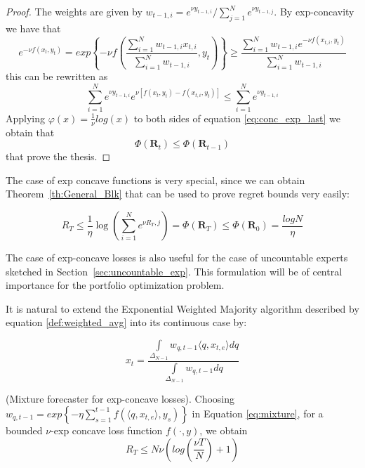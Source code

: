 \begin{proof}
    The weights are given by $w_{t-1,i}=e^{\nu y_{t-1,i}}/\sum\limits_{j=1}^N e^{\nu y_{t-1,j}}$.
    By exp-concavity we have that
    \begin{equation}
        e^{-\nu f(x_t,y_t)}=exp\left\{-\nu f \left(\frac{\sum\limits_{i=1}^N w_{t-1,i}x_{t,i}}{\sum\limits_{i=1}^N w_{t-1,i}},y_t\right)\right\}\ge \frac{\sum\limits_{i=1}^N w_{t-1,i}e^{-\nu f(x_{t,i},y_t)}}{\sum\limits_{i=1}^N w_{t-1,i}}
    \end{equation}
    this can be rewritten as 
    \begin{equation}\label{eq:conc_exp_last}
        \sum\limits_{i=1}^N e^{\nu y_{t-1,i}}e^{\nu [f(x_t,y_t)-f(x_{t,i},y_t)]}\le \sum\limits_{i=1}^N e^{\nu y_{t-1,i}}
    \end{equation}
    Applying $\varphi(x)=\frac{1}{\nu}log(x)$ to both sides of equation \eqref{eq:conc_exp_last} we obtain that $$\Phi(\mathbf R_{t})\le \Phi(\mathbf R_{t-1})$$ that prove the thesis.
\end{proof}

The case of exp concave functions is very special, since we can obtain Theorem~\ref{th:General_Blk} that can be used to prove regret bounds very easily:

\begin{equation}\label{eq:regret_exp_finite}
    R_T\le \frac{1}{\eta}\log\left(\sum\limits_{i=1}^N e^{\nu R_T,j}\right)=\Phi(\mathbf R_T)\le\Phi(\mathbf R_0) = \frac{log N}{\eta}
\end{equation}

The case of exp-concave losses is also useful for the case of uncountable experts sketched in Section~\ref{sec:uncountable_exp}. This formulation will be of central importance for the portfolio optimization problem.

It is natural to extend the Exponential Weighted Majority algorithm described by equation \eqref{def:weighted_avg} into its continuous case by:

\begin{equation}\label{eq:mixture}
    x_t=\frac{\int\limits_{\Delta_{N-1}} w_{q,t-1}\langle q,x_{t,e}\rangle dq}{\int\limits_{\Delta_{N-1}} w_{q,t-1}dq}
\end{equation}

\begin{theorem}(Mixture forecaster for exp-concave losses).\label{th:mixture_forecaster}
    Choosing $w_{q,t-1}=exp\left\{-\eta\sum\limits_{s=1}^{t-1}f(\langle q,x_{t,e}\rangle,y_s)\right\}$ in Equation \eqref{eq:mixture}, for a bounded $\nu$-exp concave loss function $f(\cdot,y)$, we obtain
    $$R_T\le N\nu\left(log\left(\frac{\nu T}{N}\right)+1\right)$$
\end{theorem}


